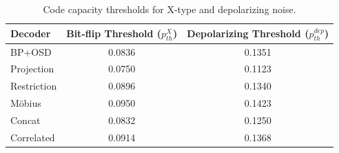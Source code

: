 \begin{table}[hbt!]
\centering
\begin{tabular}{l c c}
\toprule
Decoder & Bit-flip Threshold ($p_{th}^X$) & Depolarizing Threshold ($p_{th}^{dep}$) \\
\midrule
BP+OSD & 0.0836 & 0.1351 \\
Projection & 0.0750 & 0.1123 \\
Restriction & 0.0896 & 0.1340 \\
Möbius & 0.0950 & 0.1423 \\
Concat & 0.0832 & 0.1250 \\
Correlated & 0.0914 & 0.1368 \\
\bottomrule
\end{tabular}
\caption{Code capacity thresholds for X-type and depolarizing noise.}
\label{tab:thresholds}
\end{table}
